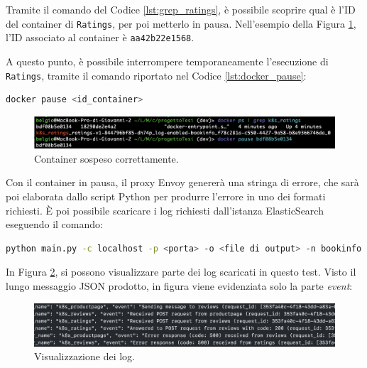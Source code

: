 Tramite il comando del Codice \ref{lst:grep_ratings}, è possibile scoprire qual è l'ID del container di \verb|Ratings|, per poi metterlo in pausa. Nell'esempio della Figura \ref{fig:pause}, l'ID associato al container è \texttt{aa42b22e1568}.

A questo punto, è possibile interrompere temporaneamente l'esecuzione di \verb|Ratings|, tramite il comando riportato nel Codice \ref{lst:docker_pause}: 
\begin{lstlisting}[caption={Pausa del container.}, label=lst:docker_pause, language=bash]
docker pause <id_container>
\end{lstlisting}

\begin{figure}[h]
    \centering
    \includegraphics[width=\textwidth]{immagini/capitolo5/pause_cont.png}
    \caption{Container sospeso correttamente.}
    \label{fig:pause}
\end{figure}


Con il container in pausa, il proxy Envoy genererà una stringa di errore, che sarà poi elaborata dallo script Python per produrre l'errore in uno dei formati richiesti. È poi possibile scaricare i log richiesti dall'istanza ElasticSearch eseguendo il comando:
\begin{lstlisting}[caption={Comando per lo scaricamento dei log da ElasticSearch.}, label=lst:log_download, language=bash]
python main.py -c localhost -p <porta> -o <file di output> -n bookinfo
\end{lstlisting}

In Figura \ref{fig:cat_log}, si possono visualizzare parte dei log scaricati in questo test. Visto il lungo messaggio JSON prodotto, in figura viene evidenziata solo la parte \textit{event}:

\begin{figure}[h]
    \centering
    \includegraphics[width=\textwidth]{immagini/capitolo5/cat_log.png}
    \caption{Visualizzazione dei log.}
    \label{fig:cat_log}
\end{figure}

